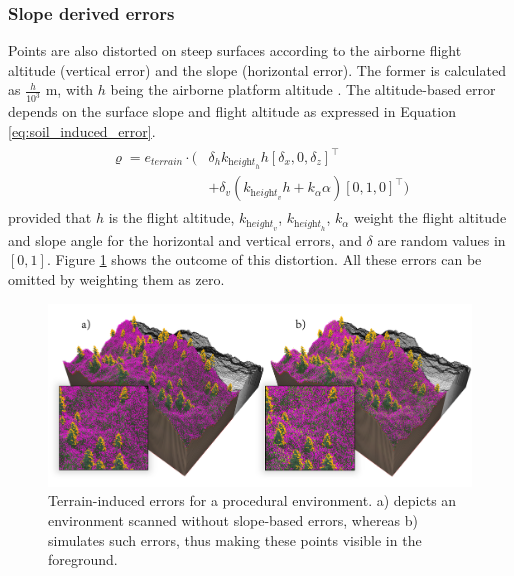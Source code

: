 \subsubsection{Slope derived errors}

Points are also distorted on steep surfaces according to the airborne flight altitude (vertical error) and the slope (horizontal error). The former is calculated as $\frac{h}{10^3}$ \si{\meter}, with $h$ being the airborne platform altitude \cite{hodgson_accuracy_2004}. The altitude-based error depends on the surface slope and flight altitude \cite{baltsavias_comparison_1999} as expressed in Equation \ref{eq:soil_induced_error}.
\begin{gather}
    \label{eq:soil_induced_error}
    \begin{aligned}
        \varrho = e_{\textit{terrain}} \cdot (&\delta_{h} k_{\textit{height}_{h}} h 
        \left[\delta_{x}, 0, \delta_{z}\right]^\intercal\\
        &+ \delta_{v} (k_{\textit{height}_{v}} h + k_{\alpha} \alpha)
        \left[0, 1, 0\right]^\intercal)
    \end{aligned}
\end{gather}
provided that $h$ is the flight altitude, $k_{\textit{height}_{v}}$, $k_{\textit{height}_{h}}$,  $k_{\alpha}$ weight the flight altitude and slope angle for the horizontal and vertical errors, and $\delta$ are random values in $[0, 1]$. Figure \ref{fig:terrain_induced_errors} shows the outcome of this distortion. All these errors can be omitted by weighting them as zero.

\begin{figure}
    \centering
    \includegraphics[width=\linewidth]{figs/lidar_simulation/terrain_induced_errors.png}
	\caption{Terrain-induced errors for a procedural environment. a) depicts an environment scanned without slope-based errors, whereas b) simulates such errors, thus making these points visible in the foreground. }
	\label{fig:terrain_induced_errors}
\end{figure}

